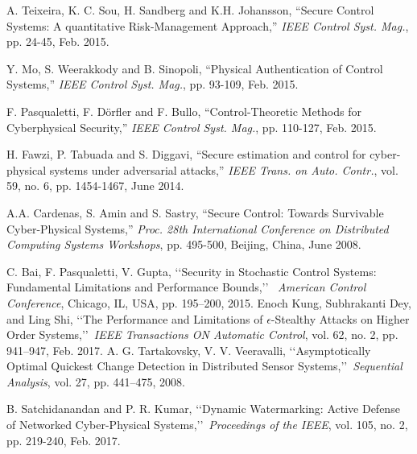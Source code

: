 \documentclass[journal,10pt]{IEEEtran}
\begin{document}
\begin{thebibliography}{1}
%

%
%


A. Teixeira, K. C. Sou, H. Sandberg and K.H. Johansson, ``Secure Control Systems: A quantitative Risk-Management Approach,'' {\em IEEE Control Syst. Mag.}, pp. 24-45, Feb. 2015.

 Y. Mo, S. Weerakkody and B. Sinopoli, ``Physical Authentication of Control Systems,'' {\em IEEE Control Syst. Mag.}, pp. 93-109, Feb. 2015.

F. Pasqualetti, F. D\"orfler and F. Bullo, ``Control-Theoretic Methods for Cyberphysical Security,'' {\em IEEE Control Syst. Mag.}, pp. 110-127, Feb. 2015.

H. Fawzi, P. Tabuada and S. Diggavi, ``Secure estimation and control for cyber-physical systems under adversarial attacks,'' 
{\em IEEE Trans. on Auto. Contr.}, vol. 59, no. 6, pp. 1454-1467, June 2014.

 A.A. Cardenas, S. Amin and S. Sastry, ``Secure Control: Towards Survivable Cyber-Physical Systems,'' {\em Proc. 28th International Conference on Distributed Computing Systems Workshops}, 
pp. 495-500, Beijing, China, June 2008.

 C. Bai, F. Pasqualetti, V. Gupta, \lq\lq Security in Stochastic Control Systems:
Fundamental Limitations and Performance Bounds,\rq\rq
~\emph{American Control Conference}, Chicago, IL, USA, pp. 195--200,
2015.
 Enoch Kung, Subhrakanti Dey, and Ling Shi, \lq\lq The Performance and Limitations of $\epsilon$-Stealthy Attacks
on Higher Order Systems,\rq\rq ~\emph{IEEE Transactions ON Automatic
Control}, vol. 62, no. 2, pp. 941--947, Feb. 2017.
 A. G. Tartakovsky, V. V. Veeravalli, \lq\lq Asymptotically Optimal Quickest Change Detection
in Distributed Sensor Systems,\rq\rq ~\emph{Sequential Analysis},
vol. 27, pp. 441--475, 2008.


 B. Satchidanandan and P. R. Kumar, \lq\lq Dynamic Watermarking: Active Defense of
Networked Cyber-Physical Systems,\rq\rq ~\emph{Proceedings of the
IEEE}, vol. 105, no. 2, pp. 219-240, Feb. 2017.


\end{thebibliography}
\end{document}
